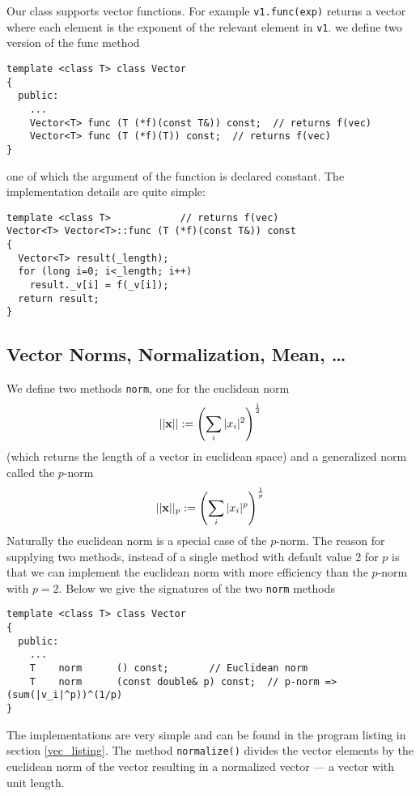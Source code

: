 Our class supports vector functions. For example \verb+v1.func(exp)+
returns a vector where each element is the exponent of the
relevant element in \verb+v1+. we define two version of the func method
{\footnotesize \begin{verbatim}
template <class T> class Vector
{
  public:
    ...
    Vector<T> func (T (*f)(const T&)) const;  // returns f(vec)
    Vector<T> func (T (*f)(T)) const;  // returns f(vec)
}
\end{verbatim}}
one of which the argument of the function is declared constant. The
implementation details are quite simple:
{\footnotesize \begin{verbatim}
template <class T>            // returns f(vec)
Vector<T> Vector<T>::func (T (*f)(const T&)) const
{
  Vector<T> result(_length);
  for (long i=0; i<_length; i++)
    result._v[i] = f(_v[i]);
  return result;
}
\end{verbatim}}


\subsection{Vector Norms, Normalization, Mean, \dots}

We define two methods \verb+norm+, one for the euclidean norm
\begin{eqnarray}
  ||{\bf x}|| := \left( \sum_i |x_i|^2 \right)^\frac{1}{2}  
\end{eqnarray}
(which returns the length of a vector in euclidean space) and a
generalized norm called the $p$-norm
\begin{eqnarray}
  ||{\bf x}||_p := \left( \sum_i |x_i|^p \right)^\frac{1}{p}  
\end{eqnarray}
Naturally the euclidean norm is a special case of the $p$-norm. The reason
for supplying two methods, instead of a single method with default
value 2 for $p$ is that we can implement the euclidean norm with
more efficiency than the $p$-norm with $p=2$. Below we give the
signatures of the two \verb+norm+ methods
{\footnotesize \begin{verbatim}
template <class T> class Vector
{
  public:
    ...
    T    norm      () const;       // Euclidean norm
    T    norm      (const double& p) const;  // p-norm => (sum(|v_i|^p))^(1/p)
}
\end{verbatim}}
The implementations are very simple and can be found in the program listing
in section \ref{vec_listing}. The method \verb+normalize()+ divides the vector
elements by the euclidean norm of the vector resulting in a normalized vector
--- a vector with unit length.


